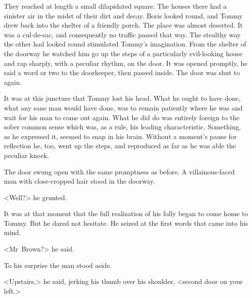 They reached at length a small dilapidated square. The houses there had a sinister air in the midst of their dirt and decay. Boris looked round, and Tommy drew back into the shelter of a friendly porch. The place was almost deserted. It was a cul-de-sac, and consequently no traffic passed that way. The stealthy way the other had looked round stimulated Tommy's imagination. From the shelter of the doorway he watched him go up the steps of a particularly evil-looking house and rap sharply, with a peculiar rhythm, on the door. It was opened promptly, he said a word or two to the doorkeeper, then passed inside. The door was shut to again.

It was at this juncture that Tommy lost his head. What he ought to have done, what any sane man would have done, was to remain patiently where he was and wait for his man to come out again. What he did do was entirely foreign to the sober common sense which was, as a rule, his leading characteristic. Something, as he expressed it, seemed to snap in his brain. Without a moment's pause for reflection he, too, went up the steps, and reproduced as far as he was able the peculiar knock.

The door swung open with the same promptness as before. A villainous-faced man with close-cropped hair stood in the doorway.

<Well?> he grunted.

It was at that moment that the full realization of his folly began to come home to Tommy. But he dared not hesitate. He seized at the first words that came into his mind.

<Mr~Brown?> he said.

To his surprise the man stood aside.

<Upstairs,> he said, jerking his thumb over his shoulder, <second door on your left.> 